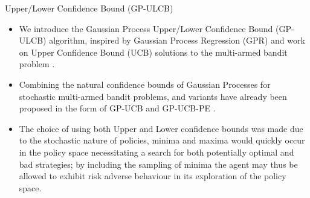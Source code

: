 \documentclass[10pt,usenames,dvipsnames]{beamer}
\begin{document}
\begin{frame}{Upper/Lower Confidence Bound (GP-ULCB)}

\begin{itemize}
\item We introduce the Gaussian Process Upper/Lower Confidence Bound  (GP-ULCB) algorithm, inspired by Gaussian Process Regression (GPR) and work on Upper Confidence Bound (UCB) solutions to the multi-armed bandit problem 
\cite{Auer2010}\cite{Auer2002}. 
\item Combining the natural confidence bounds of Gaussian Processes for stochastic multi-armed bandit problems, and variants have already been proposed in the form of GP-UCB \cite{Srinivas2009} and GP-UCB-PE \cite{Contal2013}. 
\item The choice of using both Upper and Lower confidence bounds was made due to the stochastic nature of policies, minima and maxima would quickly occur in the policy space necessitating a search for both potentially optimal and bad strategies; by including the sampling of minima the agent may thus be allowed to exhibit risk adverse behaviour in its exploration of the policy space. 

\end{itemize}



\end{frame}
\end{document}
